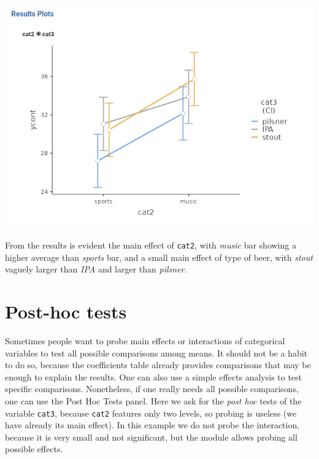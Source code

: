 \documentclass[
]{book}
\begin{document}
\includegraphics[width=9.36in]{bookletpics/2_anova_output5}

From the results is evident the main effect of \texttt{cat2}, with \emph{music} bar showing a higher average than \emph{sports} bar, and a small main effect of type of beer, with \emph{stout} vaguely larger than \emph{IPA} and larger than \emph{pilsner}.

\hypertarget{posthoc}{%
\section{Post-hoc tests}\label{posthoc}}

Sometimes people want to probe main effects or interactions of categorical variables to test all possible comparisons among means. It should not be a habit to do so, because the coefficients table already provides comparisons that may be enough to explain the results. One can also use a simple effects analysis to test specific comparisons. Nonetheless, if one really needs all possible comparisons, one can use the {Post Hoc Tests} panel. Here we ask for the \emph{post hoc} tests of the variable \texttt{cat3}, because \texttt{cat2} features only two levels, so probing is useless (we have already its main effect). In this example we do not probe the interaction, because it is very small and not significant, but the module allows probing all possible effects.
\end{document}
